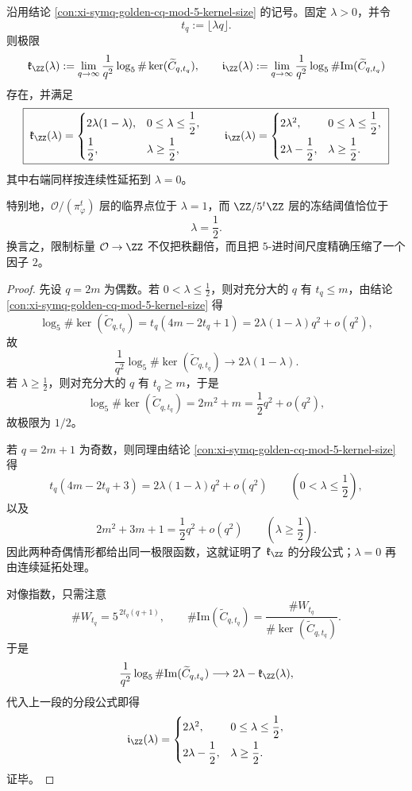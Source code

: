 \begin{theorem}\label{thm:xi-symq-golden-cq-mod5-half-threshold-phase-transition}
沿用结论 \ref{con:xi-symq-golden-cq-mod-5-kernel-size} 的记号。固定 \(\lambda>0\)，并令
\[
t_q:=\lfloor \lambda q\rfloor.
\]
则极限
\[
\mathfrak k_{\ZZ}(\lambda)
:=
\lim_{q\to\infty}\frac{1}{q^2}\log_5\#\ker(\widetilde C_{q,t_q}),
\qquad
\mathfrak i_{\ZZ}(\lambda)
:=
\lim_{q\to\infty}\frac{1}{q^2}\log_5\#\mathrm{Im}(\widetilde C_{q,t_q})
\]
存在，并满足
\[
\boxed{\;
\mathfrak k_{\ZZ}(\lambda)=
\begin{cases}
2\lambda(1-\lambda),& 0\le \lambda\le \dfrac12,\\[6pt]
\dfrac12,& \lambda\ge \dfrac12,
\end{cases}
\qquad
\mathfrak i_{\ZZ}(\lambda)=
\begin{cases}
2\lambda^2,& 0\le \lambda\le \dfrac12,\\[6pt]
2\lambda-\dfrac12,& \lambda\ge \dfrac12.
\end{cases}
\;}
\]
其中右端同样按连续性延拓到 \(\lambda=0\)。

特别地，\(\mathcal O/(\pi_\varphi^t)\) 层的临界点位于 \(\lambda=1\)，而 \(\ZZ/5^t\ZZ\) 层的冻结阈值恰位于
\[
\lambda=\frac12.
\]
换言之，限制标量 \(\mathcal O\to \ZZ\) 不仅把秩翻倍，而且把 \(5\)-进时间尺度精确压缩了一个因子 \(2\)。
\end{theorem}
\begin{proof}
先设 \(q=2m\) 为偶数。若 \(0<\lambda\le \frac12\)，则对充分大的 \(q\) 有 \(t_q\le m\)，由结论 \ref{con:xi-symq-golden-cq-mod-5-kernel-size} 得
\[
\log_5\#\ker(\widetilde C_{q,t_q})
=
t_q(4m-2t_q+1)
=
2\lambda(1-\lambda)q^2+o(q^2),
\]
故
\[
\frac{1}{q^2}\log_5\#\ker(\widetilde C_{q,t_q})
\longrightarrow
2\lambda(1-\lambda).
\]
若 \(\lambda\ge \frac12\)，则对充分大的 \(q\) 有 \(t_q\ge m\)，于是
\[
\log_5\#\ker(\widetilde C_{q,t_q})
=
2m^2+m
=
\frac12 q^2+o(q^2),
\]
故极限为 \(1/2\)。

若 \(q=2m+1\) 为奇数，则同理由结论 \ref{con:xi-symq-golden-cq-mod-5-kernel-size} 得
\[
t_q(4m-2t_q+3)=2\lambda(1-\lambda)q^2+o(q^2)
\qquad
\left(0<\lambda\le \frac12\right),
\]
以及
\[
2m^2+3m+1=\frac12 q^2+o(q^2)
\qquad
\left(\lambda\ge \frac12\right).
\]
因此两种奇偶情形都给出同一极限函数，这就证明了 \(\mathfrak k_{\ZZ}\) 的分段公式；\(\lambda=0\) 再由连续延拓处理。

对像指数，只需注意
\[
\#W_{t_q}=5^{\,2t_q(q+1)},
\qquad
\#\mathrm{Im}(\widetilde C_{q,t_q})
=
\frac{\#W_{t_q}}{\#\ker(\widetilde C_{q,t_q})}.
\]
于是
\[
\frac{1}{q^2}\log_5\#\mathrm{Im}(\widetilde C_{q,t_q})
\longrightarrow
2\lambda-\mathfrak k_{\ZZ}(\lambda),
\]
代入上一段的分段公式即得
\[
\mathfrak i_{\ZZ}(\lambda)=
\begin{cases}
2\lambda^2,& 0\le \lambda\le \dfrac12,\\[6pt]
2\lambda-\dfrac12,& \lambda\ge \dfrac12.
\end{cases}
\]
证毕。
\end{proof}

\endinput
